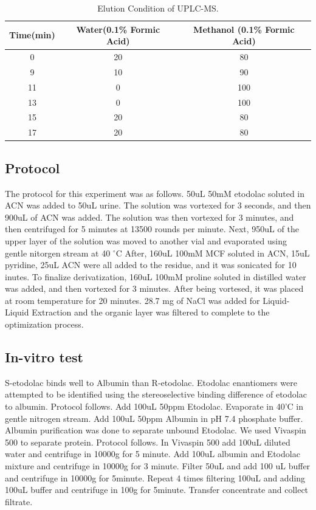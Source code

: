 \documentclass[12pt]{article} %
\begin{document}
\begin{table}[h]
  \begin{center}
    \caption{Elution Condition of UPLC-MS.}
    \label{tab:table1}
    \begin{tabular}{ccc}
      \toprule
      Time(min) & Water(0.1\% Formic Acid) & Methanol (0.1\% Formic Acid) \\
      \midrule
      0 & 20 & 80 \\
      \midrule
      9 & 10 & 90 \\
      \midrule
      11 & 0 & 100 \\
      \midrule
      13 & 0 & 100 \\
      \midrule
      15 & 20 & 80 \\
      \midrule
      17 & 20 & 80 \\
      \bottomrule
    \end{tabular}
  \end{center}
\end{table}

\subsection {Protocol}
 The protocol for this experiment was as follows. 50uL 50mM etodolac soluted in ACN was added to 50uL urine. The solution was vortexed for 3 seconds, and then 900uL of ACN was added. The solution was then vortexed for 3 minutes, and then centrifuged for 5 minutes at 13500 rounds per minute. Next, 950uL of the upper layer of the solution was moved to another vial and evaporated using gentle nitorgen stream at 40 $^{\circ}$C After, 160uL 100mM MCF soluted in ACN, 15uL pyridine, 25uL ACN were all added to the residue, and it was sonicated for 10 inutes. To finalize derivatization, 160uL 100mM proline soluted in distilled water was added, and then vortexed for 3 minutes. After being vortesed, it was placed at room temperature for 20 minutes. 28.7 mg of NaCl was added for Liquid-Liquid Extraction and the organic layer was filtered to complete to the optimization process.


\subsection {In-vitro test}
 S-etodolac binds well to Albumin than R-etodolac.\cite{cite4} Etodolac enantiomers were attempted to be identified using the stereoselective binding difference of etodolac to albumin.
 Protocol follows.  Add 100uL 50ppm Etodolac. Evaporate in 40'C in gentle nitrogen stream. Add 100uL 50ppm Albumin in pH 7.4 phosphate buffer.
 Albumin purification was done to separate unbound Etodolac. We used Vivaspin 500 to separate protein.
 Protocol follows. In Vivaspin 500 add 100uL diluted water and centrifuge in 10000g for 5 minute. Add 100uL albumin and Etodolac mixture and centrifuge in 10000g for 3 minute. Filter 50uL and add 100 uL buffer and centrifuge in 10000g for 5minute. Repeat 4 times filtering 100uL and adding 100uL buffer and centrifuge in 100g for 5minute. Transfer concentrate and collect filtrate.
\end{document}
